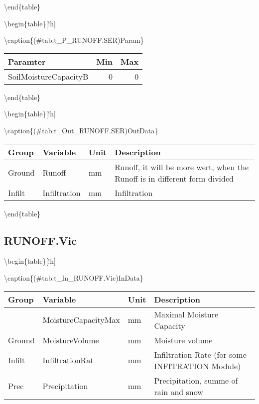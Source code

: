 \documentclass[
]{book}
\begin{document}
\textbackslash end\{table\}

\textbackslash begin\{table\}{[}!h{]}

\textbackslash caption\{(\#tab:t\_P\_RUNOFF.SER)Param\}
\centering

\begin{tabular}[t]{l|r|r}
\hline
Paramter & Min & Max\\
\hline
SoilMoistureCapacityB & 0 & 0\\
\hline
\end{tabular}

\textbackslash end\{table\}

\textbackslash begin\{table\}{[}!h{]}

\textbackslash caption\{(\#tab:t\_Out\_RUNOFF.SER)OutData\}
\centering

\begin{tabular}[t]{l|l|l|l}
\hline
Group & Variable & Unit & Description\\
\hline
Ground & Runoff & mm & Runoff, it will be more wert, when the Runoff is in different form divided\\
\cline{1-4}
Infilt & Infiltration & mm & Infiltration\\
\hline
\end{tabular}

\textbackslash end\{table\}

\hypertarget{runoff.vic}{%
\subsection{RUNOFF.Vic}\label{runoff.vic}}

\textbackslash begin\{table\}{[}!h{]}

\textbackslash caption\{(\#tab:t\_In\_RUNOFF.Vic)InData\}
\centering

\begin{tabular}[t]{l|l|l|l}
\hline
Group & Variable & Unit & Description\\
\hline
 & MoistureCapacityMax & mm & Maximal Moisture Capacity\\
\cline{2-4}
\multirow{-2}{*}{\raggedright\arraybackslash Ground} & MoistureVolume & mm & Moisture volume\\
\cline{1-4}
Infilt & InfiltrationRat & mm & Infiltration Rate (for some INFITRATION Module)\\
\cline{1-4}
Prec & Precipitation & mm & Precipitation, summe of rain and snow\\
\hline
\end{tabular}
\end{document}
